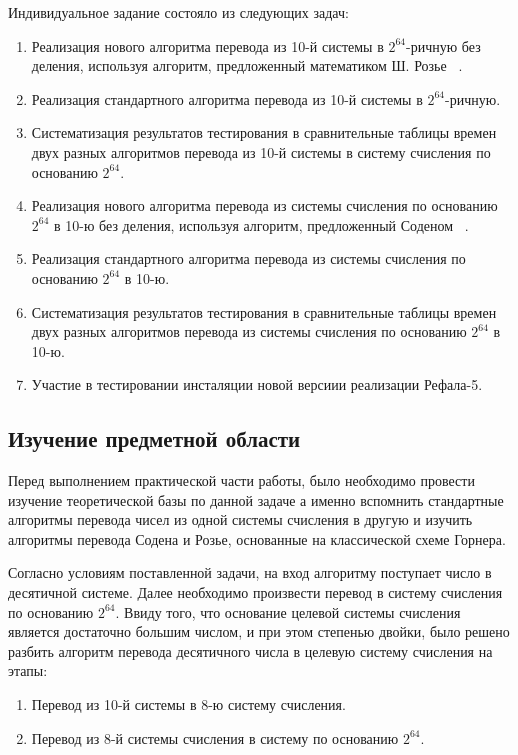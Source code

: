 \documentclass[14pt, russian]{scrartcl}
\begin{document}
Индивидуальное задание состояло из следующих задач:
\begin{enumerate}
\item Реализация нового алгоритма перевода из 10-й системы в $2^{64}$-ричную без деления, используя алгоритм, предложенный математиком Ш. Розье ~\cite{ZlatoPol}.
\item Реализация стандартного алгоритма перевода из 10-й системы в $2^{64}$-ричную.
\item Систематизация результатов тестирования в сравнительные таблицы времен двух разных алгоритмов перевода из 10-й системы в систему счисления по основанию $2^{64}$.
\item Реализация нового алгоритма перевода из системы счисления по основанию $2^{64}$ в 10-ю без деления, используя алгоритм, предложенный Соденом ~\cite{ZlatoPol}.
\item Реализация стандартного алгоритма перевода из системы счисления по основанию $2^{64}$ в 10-ю.
\item Систематизация результатов тестирования в сравнительные таблицы времен двух разных алгоритмов перевода из системы счисления по основанию $2^{64}$ в 10-ю.
\item Участие в тестировании инсталяции новой версиии реализации Рефала-5.
\end{enumerate}

\subsection{Изучение предметной области}
Перед выполнением практической части работы, было необходимо провести изучение теоретической базы по данной задаче а именно вспомнить стандартные алгоритмы перевода чисел из одной системы счисления в другую и изучить алгоритмы перевода Содена и Розье, основанные на классической схеме Горнера.

Согласно условиям поставленной задачи, на вход алгоритму поступает число в десятичной системе. Далее необходимо произвести перевод в систему счисления по основанию $2^{64}$. Ввиду того, что основание целевой системы счисления является достаточно большим числом, и при этом степенью двойки, было решено разбить алгоритм перевода десятичного числа в целевую систему счисления на этапы:
\begin{enumerate}
\item Перевод из 10-й системы в 8-ю систему счисления.
\item Перевод из 8-й системы счисления в систему по основанию $2^{64}$.
\end{enumerate}
\end{document}
